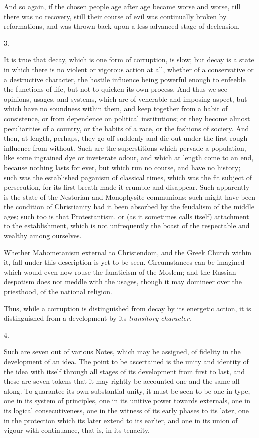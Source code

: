 And so again, if the chosen people age after age
became worse and worse, till there was no recovery, still
their course of evil was continually broken by
reformations, and was thrown back upon a less advanced
stage of declension.

3.

It is true that decay, which is one form of
corruption, is slow; but decay is a state in which there
is no violent or vigorous action at all, whether of a
conservative or a destructive character, the hostile
influence being powerful enough to enfeeble the functions
of life, but not to quicken its own process. And thus we
see opinions, usages, and systems, which are of venerable
and imposing aspect, but which have no soundness within
them, and keep together from a habit of consistence, or
from dependence on political institutions; or they become
almost peculiarities of a country, or the habits of a
race, or the fashions of society. And then, at length,
perhaps, they go off suddenly and die out under the first
rough influence from without. Such are the superstitions
which pervade a population, like some ingrained dye or
inveterate odour, and which at length come to an end,
because nothing lasts for ever, but which run no course,
and have no history; such was the established paganism of
classical times, which was the fit subject of
persecution, for its first breath made it crumble and
disappear. Such apparently is the state of the Nestorian
and Monophysite communions; such might have been the
condition of Christianity had it been absorbed by the
feudalism of the middle ages; such too is that
Protestantism, or (as it sometimes calls itself)
attachment to the establishment, which is not
unfrequently the boast of the respectable and wealthy
among ourselves.

Whether Mahometanism external to Christendom, and the
Greek Church within it, fall under this description is
yet to be seen. Circumstances can be imagined which would
even now rouse the fanaticism of the Moslem; and the
Russian despotism does not meddle with the usages, though
it may domineer over the priesthood, of the national
religion.

Thus, while a corruption is distinguished from decay
by its energetic action, it is distinguished from a
development by its \emph{transitory character}.

4.

Such are seven out of various Notes, which may be assigned, of fidelity in the development of an idea. The
point to be ascertained is the unity and identity of the
idea with itself through all stages of its development
from first to last, and these are seven tokens that it
may rightly be accounted one and the same all along. To
guarantee its own substantial unity, it must be seen to
be one in type, one in its system of principles, one in
its unitive power towards externals, one in its logical
consecutiveness, one in the witness of its early phases
to its later, one in the protection which its later
extend to its earlier, and one in its union of vigour
with continuance, that is, in its tenacity.

